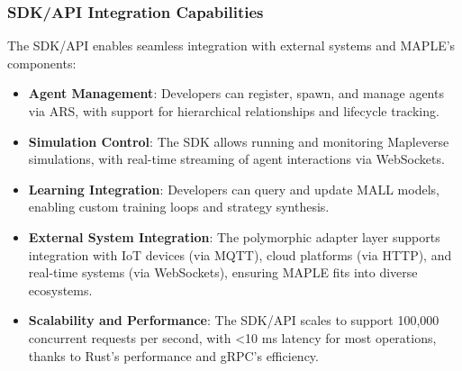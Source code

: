 \documentclass[a4paper,11pt]{article}
\begin{document}
\subsubsection{SDK/API Integration Capabilities}
The SDK/API enables seamless integration with external systems and MAPLE’s components:
\begin{itemize}[leftmargin=*]
    \item \textbf{Agent Management}: Developers can register, spawn, and manage agents via ARS, with support for hierarchical relationships and lifecycle tracking.
    \item \textbf{Simulation Control}: The SDK allows running and monitoring Mapleverse simulations, with real-time streaming of agent interactions via WebSockets.
    \item \textbf{Learning Integration}: Developers can query and update MALL models, enabling custom training loops and strategy synthesis.
    \item \textbf{External System Integration}: The polymorphic adapter layer supports integration with IoT devices (via MQTT), cloud platforms (via HTTP), and real-time systems (via WebSockets), ensuring MAPLE fits into diverse ecosystems.
    \item \textbf{Scalability and Performance}: The SDK/API scales to support 100,000 concurrent requests per second, with <10 ms latency for most operations, thanks to Rust’s performance and gRPC’s efficiency.
\end{itemize}
\end{document}
